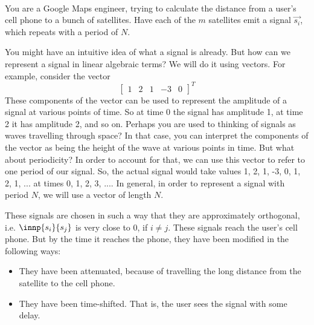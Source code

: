 

\\
You are a Google Maps engineer, trying to calculate the distance from a user's cell phone to a bunch of satellites. Have each of the $m$ satellites emit a signal $\vec{s_i}$, which repeats with a period of $N$. 

You might have an intuitive idea of what a signal is already. But how can we represent a signal in linear algebraic terms? We will do it using vectors. For example, consider the vector
$$\begin{bmatrix} 1 & 2 & 1 & -3 & 0\end{bmatrix}^T$$
These components of the vector can be used to represent the amplitude of a signal at various points of time. So at time 0 the signal has amplitude 1, at time 2 it has amplitude 2, and so on. Perhaps you are used to thinking of signals as waves travelling through space? In that case, you can interpret the components of the vector as being the height of the wave at various points in time. But what about periodicity? In order to account for that, we can use this vector to refer to one period of our signal. So, the actual signal would take values 1, 2, 1, -3, 0, 1, 2, 1, ... at times 0, 1, 2, 3, ....
In general, in order to represent a signal with period $N$, we will use a vector of length $N$.


These signals are chosen in such a way that they are approximately orthogonal, i.e. $\innp{s_i}{s_j}$ is very close to 0, if $i \neq j$. These signals reach the user's cell phone. But by the time it reaches the phone, they have been modified in the following ways:

\begin{itemize}
    \item They have been attenuated, because of travelling the long distance from the satellite to the cell phone.
    \item They have been time-shifted. That is, the user sees the signal with some delay.
\end{itemize}



